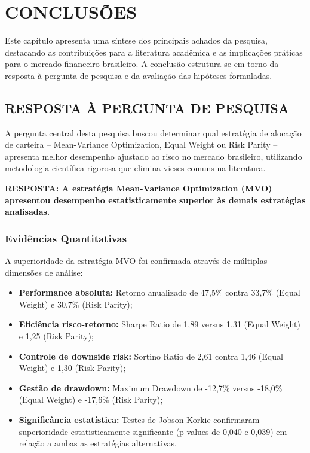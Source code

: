 
\chapter{CONCLUSÕES}

Este capítulo apresenta uma síntese dos principais achados da pesquisa, destacando as contribuições para a literatura acadêmica e as implicações práticas para o mercado financeiro brasileiro. A conclusão estrutura-se em torno da resposta à pergunta de pesquisa e da avaliação das hipóteses formuladas.

\section{RESPOSTA À PERGUNTA DE PESQUISA}

A pergunta central desta pesquisa buscou determinar qual estratégia de alocação de carteira -- Mean-Variance Optimization, Equal Weight ou Risk Parity -- apresenta melhor desempenho ajustado ao risco no mercado brasileiro, utilizando metodologia científica rigorosa que elimina vieses comuns na literatura.

\textbf{RESPOSTA: A estratégia Mean-Variance Optimization (MVO) apresentou desempenho estatisticamente superior às demais estratégias analisadas.}

\subsection{Evidências Quantitativas}

A superioridade da estratégia MVO foi confirmada através de múltiplas dimensões de análise:

\begin{itemize}
    \item \textbf{Performance absoluta:} Retorno anualizado de 47,5\% contra 33,7\% (Equal Weight) e 30,7\% (Risk Parity);
    
    \item \textbf{Eficiência risco-retorno:} Sharpe Ratio de 1,89 versus 1,31 (Equal Weight) e 1,25 (Risk Parity);
    
    \item \textbf{Controle de downside risk:} Sortino Ratio de 2,61 contra 1,46 (Equal Weight) e 1,30 (Risk Parity);
    
    \item \textbf{Gestão de drawdown:} Maximum Drawdown de -12,7\% versus -18,0\% (Equal Weight) e -17,6\% (Risk Parity);
    
    \item \textbf{Significância estatística:} Testes de Jobson-Korkie confirmaram superioridade estatisticamente significante (p-values de 0,040 e 0,039) em relação a ambas as estratégias alternativas.
\end{itemize}

